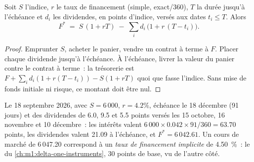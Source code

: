\begin{proposition}\label{prop:m1:basis-roll-and-delivery:fv}
Soit $S$ l'indice, $r$ le taux de financement (simple, exact/360), $T$ la
durée jusqu'à l'échéance et $d_i$ les dividendes, en points d'indice, versés aux dates $t_i
\le T$. Alors
\[
F^* \;=\; S\,(1 + rT) \;-\; \sum_i d_i\,\bigl(1 + r\,(T - t_i)\bigr).
\]
\end{proposition}
\begin{proof}
Emprunter $S$, acheter le panier, vendre un contrat à terme à $F$. Placer chaque dividende jusqu'à
l'échéance. À l'échéance, livrer la valeur du panier contre le contrat à terme~: la trésorerie est
$F + \sum_i d_i(1 + r(T-t_i)) - S(1+rT)$ quoi que fasse l'indice. Sans
mise de fonds initiale ni risque, ce montant doit être nul.
\end{proof}

\begin{example}\label{ex:m1:basis-roll-and-delivery:43}
Le 18 septembre 2026, avec $S = 6\,000$, $r = 4.2\%$, échéance le 18 décembre (91
jours) et des dividendes de 6.0, 9.5 et 5.5 points versés les 15 octobre, 16
novembre et 10 décembre~: les intérêts valent $6\,000 \times 0.042 \times 91/360 =
63.70$ points, les dividendes valent 21.09 à l'échéance, et $F^* = 6\,042.61$.
Un cours de marché de 6\,047.20 correspond à un \emph{taux de financement
implicite} de 4.50~\%~: le 
du \cref{ch:m1:delta-one-instruments}, 30 points de base, vu de l'autre côté.
\end{example}

\begin{omfigure}

\label{fig:m1:basis-roll-and-delivery:basis}
\end{omfigure}

